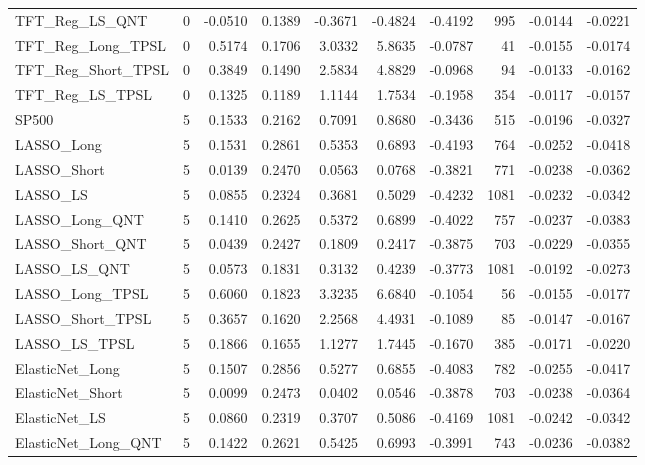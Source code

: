 \begin{tabular}{llrrrrrrrr}
\cline{1-10}
TFT\_Reg\_LS\_QNT & 0 & -0.0510 & 0.1389 & -0.3671 & -0.4824 & -0.4192 & 995 & -0.0144 & -0.0221 \\
\cline{1-10}
TFT\_Reg\_Long\_TPSL & 0 & 0.5174 & 0.1706 & 3.0332 & 5.8635 & -0.0787 & 41 & -0.0155 & -0.0174 \\
\cline{1-10}
TFT\_Reg\_Short\_TPSL & 0 & 0.3849 & 0.1490 & 2.5834 & 4.8829 & -0.0968 & 94 & -0.0133 & -0.0162 \\
\cline{1-10}
TFT\_Reg\_LS\_TPSL & 0 & 0.1325 & 0.1189 & 1.1144 & 1.7534 & -0.1958 & 354 & -0.0117 & -0.0157 \\
\cline{1-10}
SP500 & 5 & 0.1533 & 0.2162 & 0.7091 & 0.8680 & -0.3436 & 515 & -0.0196 & -0.0327 \\
\cline{1-10}
LASSO\_Long & 5 & 0.1531 & 0.2861 & 0.5353 & 0.6893 & -0.4193 & 764 & -0.0252 & -0.0418 \\
\cline{1-10}
LASSO\_Short & 5 & 0.0139 & 0.2470 & 0.0563 & 0.0768 & -0.3821 & 771 & -0.0238 & -0.0362 \\
\cline{1-10}
LASSO\_LS & 5 & 0.0855 & 0.2324 & 0.3681 & 0.5029 & -0.4232 & 1081 & -0.0232 & -0.0342 \\
\cline{1-10}
LASSO\_Long\_QNT & 5 & 0.1410 & 0.2625 & 0.5372 & 0.6899 & -0.4022 & 757 & -0.0237 & -0.0383 \\
\cline{1-10}
LASSO\_Short\_QNT & 5 & 0.0439 & 0.2427 & 0.1809 & 0.2417 & -0.3875 & 703 & -0.0229 & -0.0355 \\
\cline{1-10}
LASSO\_LS\_QNT & 5 & 0.0573 & 0.1831 & 0.3132 & 0.4239 & -0.3773 & 1081 & -0.0192 & -0.0273 \\
\cline{1-10}
LASSO\_Long\_TPSL & 5 & 0.6060 & 0.1823 & 3.3235 & 6.6840 & -0.1054 & 56 & -0.0155 & -0.0177 \\
\cline{1-10}
LASSO\_Short\_TPSL & 5 & 0.3657 & 0.1620 & 2.2568 & 4.4931 & -0.1089 & 85 & -0.0147 & -0.0167 \\
\cline{1-10}
LASSO\_LS\_TPSL & 5 & 0.1866 & 0.1655 & 1.1277 & 1.7445 & -0.1670 & 385 & -0.0171 & -0.0220 \\
\cline{1-10}
ElasticNet\_Long & 5 & 0.1507 & 0.2856 & 0.5277 & 0.6855 & -0.4083 & 782 & -0.0255 & -0.0417 \\
\cline{1-10}
ElasticNet\_Short & 5 & 0.0099 & 0.2473 & 0.0402 & 0.0546 & -0.3878 & 703 & -0.0238 & -0.0364 \\
\cline{1-10}
ElasticNet\_LS & 5 & 0.0860 & 0.2319 & 0.3707 & 0.5086 & -0.4169 & 1081 & -0.0242 & -0.0342 \\
\cline{1-10}
ElasticNet\_Long\_QNT & 5 & 0.1422 & 0.2621 & 0.5425 & 0.6993 & -0.3991 & 743 & -0.0236 & -0.0382 \\

\end{tabular}
